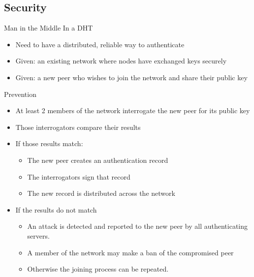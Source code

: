 \documentclass[11pt]{beamer}
\begin{document}
\subsection{Security}

\begin{frame}{Man in the Middle In a DHT}
	
	\begin{itemize}
		\item Need to have a distributed, reliable way to authenticate 
		\item  Given: an existing network where nodes have exchanged keys securely
		\item  Given: a new peer who wishes to join the network and share their public key
		
	\end{itemize}
	
	
\end{frame}



\begin{frame}{Prevention}
	
	\begin{itemize}
		\item  At least 2 members of the network interrogate the new peer for its public key
		\item  Those interrogators compare their results
		\item  If those results match:
		\begin{itemize}
			
			\item The new peer creates an authentication record
			\item The interrogators sign that record
			\item The new record is distributed across the network
		\end{itemize}
		
		
		\item  If the results do not match
		\begin{itemize}
			
			\item An attack is detected and reported to the new peer by all authenticating servers.
			\item A member of the network may make a ban of the compromised peer
			\item Otherwise the joining process can be repeated.
		\end{itemize}
		
	\end{itemize}
	
	
\end{frame}
\end{document}
